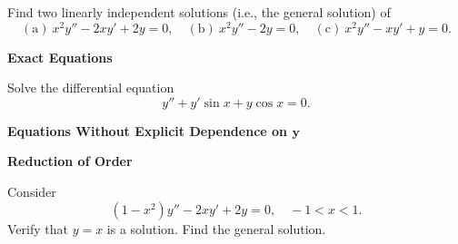 {\begin{Exercise}
\end{Exercise}






\begin{Exercise}
  \label{exercise x2y-2xy+2y=0}
  Find two linearly independent solutions (i.e., the general solution) of 
  \[
  \mathrm{(a)}\ x^2 y'' - 2 x y' + 2 y = 0, \quad
  \mathrm{(b)}\ x^2 y'' - 2 y = 0, \quad
  \mathrm{(c)}\ x^2 y'' - x y' + y = 0.
  \]

\end{Exercise}







\begin{large}
  \noindent
  \textbf{Exact Equations}
\end{large}



\begin{Exercise}
  \label{exercise y+ysinx+ycosx}
  Solve the differential equation
  \[ 
  y'' + y' \sin x + y \cos x  = 0. 
  \]

\end{Exercise}





\begin{large}
  \noindent
  \textbf{Equations Without Explicit Dependence on $\mathbf{y}$}
\end{large}

\begin{large}
  \noindent
  \textbf{Reduction of Order}
\end{large}




\begin{Exercise}
  \label{exercise 1-x2y-2xy+2y}
  Consider
  \[
  (1-x^2) y'' - 2 x y' + 2 y = 0, \quad -1 < x < 1.
  \]
  Verify that $y = x$ is a solution.  Find the general solution.


\end{Exercise}}
